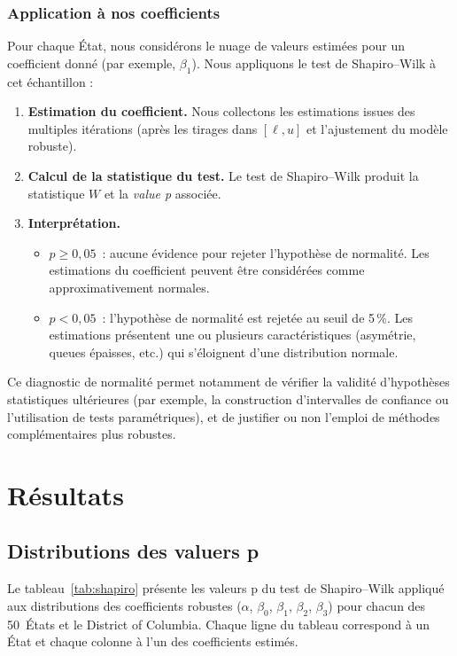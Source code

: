 \subsubsection*{Application à nos coefficients}
Pour chaque État, nous considérons le nuage de valeurs estimées pour un coefficient donné (par exemple, \(\beta_1\)). Nous appliquons le test de Shapiro–Wilk à cet échantillon :
\begin{enumerate}
	\item \textbf{Estimation du coefficient.} Nous collectons les estimations issues des multiples itérations (après les tirages dans \([\ell,u]\) et l'ajustement du modèle robuste). 
	\item \textbf{Calcul de la statistique du test.} Le test de Shapiro–Wilk produit la statistique \(W\) et la \emph{value p} associée.
	\item \textbf{Interprétation.} 
	\begin{itemize}
		\item \(p \geq 0{,}05\)~: aucune évidence pour rejeter l'hypothèse de normalité. Les estimations du coefficient peuvent être considérées comme approximativement normales.
		\item \(p < 0{,}05\)~: l'hypothèse de normalité est rejetée au seuil de 5\,\%. Les estimations présentent une ou plusieurs caractéristiques (asymétrie, queues épaisses, etc.) qui s'éloignent d'une distribution normale.
	\end{itemize}
\end{enumerate}

Ce diagnostic de normalité permet notamment de vérifier la validité d'hypothèses statistiques ultérieures (par exemple, la construction d'intervalles de confiance ou l'utilisation de tests paramétriques), et de justifier ou non l'emploi de méthodes complémentaires plus robustes. 


\section{Résultats}

\subsection{Distributions des valuers p}
Le tableau~\ref{tab:shapiro} présente les valeurs p du test de Shapiro--Wilk appliqué aux distributions des coefficients robustes (\(\alpha\), \(\beta_0\), \(\beta_1\), \(\beta_2\), \(\beta_3\)) pour chacun des 50~États et le District of Columbia. Chaque ligne du tableau correspond à un État et chaque colonne à l'un des coefficients estimés.

